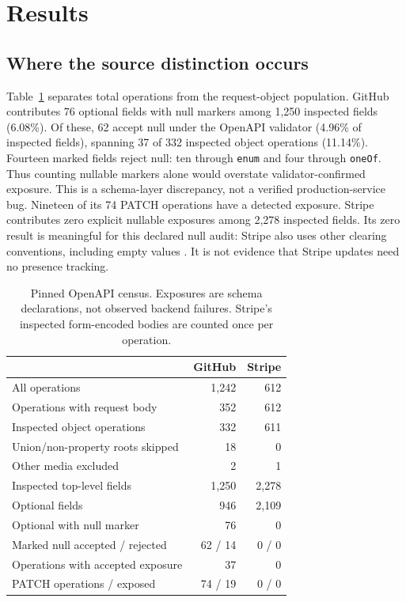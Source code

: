 \documentclass[10pt,twocolumn]{article}
\begin{document}
\section{Results}
\subsection{Where the source distinction occurs}
Table~\ref{tab:census} separates total operations from the request-object population. GitHub contributes 76 optional fields with null markers among 1,250 inspected fields (6.08\%). Of these, 62 accept null under the OpenAPI validator (4.96\% of inspected fields), spanning 37 of 332 inspected object operations (11.14\%). Fourteen marked fields reject null: ten through \texttt{enum} and four through \texttt{oneOf}. Thus counting nullable markers alone would overstate validator-confirmed exposure. This is a schema-layer discrepancy, not a verified production-service bug. Nineteen of its 74 PATCH operations have a detected exposure. Stripe contributes zero explicit nullable exposures among 2,278 inspected fields. Its zero result is meaningful for this declared null audit: Stripe also uses other clearing conventions, including empty values \citep{stripeapi}. It is not evidence that Stripe updates need no presence tracking.

\begin{table}[t]
\centering\small
\begin{tabular}{lrr}
\toprule & GitHub & Stripe\\\midrule
All operations & 1,242 & 612\\
Operations with request body & 352 & 612\\
Inspected object operations & 332 & 611\\
Union/non-property roots skipped & 18 & 0\\
Other media excluded & 2 & 1\\
Inspected top-level fields & 1,250 & 2,278\\
Optional fields & 946 & 2,109\\
Optional with null marker & 76 & 0\\
Marked null accepted / rejected & 62 / 14 & 0 / 0\\
Operations with accepted exposure & 37 & 0\\
PATCH operations / exposed & 74 / 19 & 0 / 0\\
\bottomrule
\end{tabular}
\caption{Pinned OpenAPI census. Exposures are schema declarations, not observed backend failures. Stripe's inspected form-encoded bodies are counted once per operation.}\label{tab:census}
\end{table}
\end{document}
